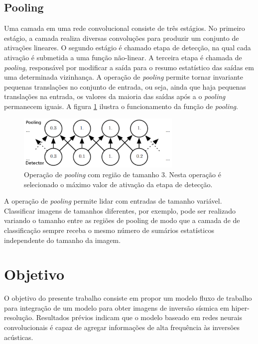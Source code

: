 \subsection{Pooling}
Uma camada em uma rede convolucional consiste de três estágios. No primeiro estágio,
a camada realiza diversas convoluções para produzir um conjunto de ativações lineares.
O segundo estágio é chamado etapa de detecção, na qual cada ativação é submetida a uma
função não-linear. A terceira etapa é chamada de \textit{pooling}, responsável por
modificar a saída para o resumo estatístico das saídas em uma determinada vizinhança. A operação de
\textit{pooling} permite tornar invariante pequenas translações no conjunto de entrada,
ou seja, ainda que haja pequenas translações na entrada, os valores da maioria das saídas após a
o \textit{pooling} permanecem iguais. A figura \ref{fig:pool} ilustra o funcionamento da função de \textit{pooling}.
\begin{figure}[htp]
\begin{center}
  \includegraphics[width=0.7\textwidth]{fig/pool}
  \caption{Operação de \textit{pooling} com região de tamanho 3. Nesta operação é selecionado o máximo valor de ativação da etapa de detecção.}
  \label{fig:pool}
\end{center}
\end{figure}

A operação de \textit{pooling} permite lidar com entradas de tamanho variável.
Classificar imagens de tamanhos diferentes, por exemplo, pode ser realizado
variando o tamanho entre as regiões de pooling de modo que a camada de 
de classificação sempre receba o mesmo número de sumários estatísticos
independente do tamanho da imagem.

\section{Objetivo}

O objetivo do presente trabalho consiste em propor um modelo fluxo de trabalho
para integração de um modelo para obter imagens de inversão sísmica em hiper-resolução.
Resultados prévios indicam que o modelo baseado em redes neurais convolucionais é capaz
de agregar informações de alta frequência às inversões acústicas.

